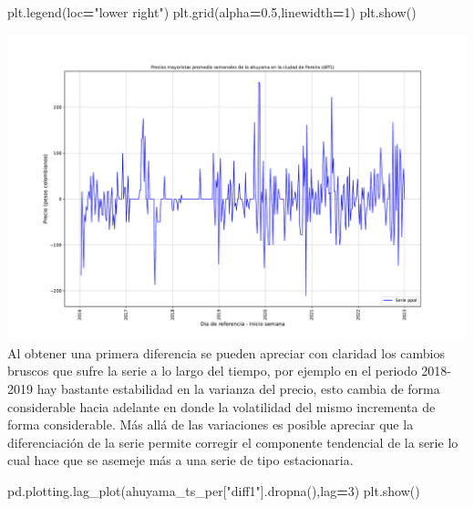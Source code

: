 \documentclass[
]{book}
\newenvironment{Shaded}{\begin{snugshade}}{\end{snugshade}}
\newcommand{\DecValTok}[1]{\textcolor[rgb]{0.00,0.00,0.81}{#1}}
\newcommand{\FloatTok}[1]{\textcolor[rgb]{0.00,0.00,0.81}{#1}}
\newcommand{\NormalTok}[1]{#1}
\newcommand{\OperatorTok}[1]{\textcolor[rgb]{0.81,0.36,0.00}{\textbf{#1}}}
\newcommand{\StringTok}[1]{\textcolor[rgb]{0.31,0.60,0.02}{#1}}
\begin{document}
\begin{Shaded}
\begin{Highlighting}[]
\NormalTok{plt.legend(loc}\OperatorTok{=}\StringTok{"lower right"}\NormalTok{)}
\NormalTok{plt.grid(alpha}\OperatorTok{=}\FloatTok{0.5}\NormalTok{,linewidth}\OperatorTok{=}\DecValTok{1}\NormalTok{)}
\NormalTok{plt.show()}
\end{Highlighting}
\end{Shaded}

\includegraphics{bookdown-demo_files/figure-latex/unnamed-chunk-90-65.pdf}
Al obtener una primera diferencia se pueden apreciar con claridad los cambios bruscos que sufre la serie a lo largo del tiempo, por ejemplo en el periodo 2018-2019 hay bastante estabilidad en la varianza del precio, esto cambia de forma considerable hacia adelante en donde la volatilidad del mismo incrementa de forma considerable. Más allá de las variaciones es posible apreciar que la diferenciación de la serie permite corregir el componente tendencial de la serie lo cual hace que se asemeje más a una serie de tipo estacionaria.

\begin{Shaded}
\begin{Highlighting}[]

\NormalTok{pd.plotting.lag\_plot(ahuyama\_ts\_per[}\StringTok{"diff1"}\NormalTok{].dropna(),lag}\OperatorTok{=}\DecValTok{3}\NormalTok{)}
\NormalTok{plt.show()}
\end{Highlighting}
\end{Shaded}
\end{document}
